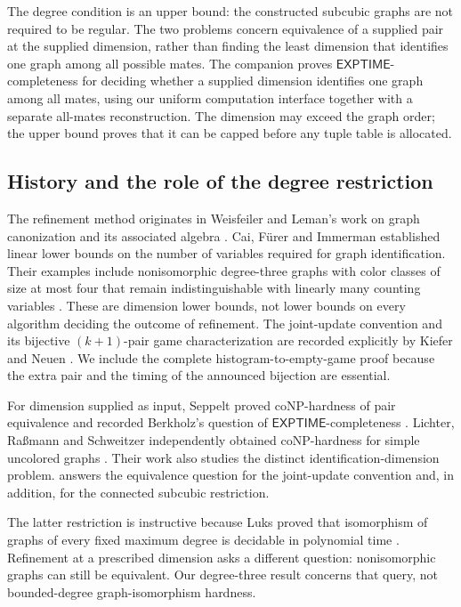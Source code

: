 \documentclass[11pt]{article}
\theoremstyle{definition}
\begin{document}
The degree condition is an upper bound: the constructed subcubic graphs
are not required to be regular. The two problems concern equivalence
of a supplied pair at the supplied dimension, rather than finding the
least dimension that identifies one graph among all possible mates.
The companion \citep[Theorem~1.1]{CompanionIdentification}
proves \(\mathsf{EXPTIME}\)-completeness for deciding whether a supplied
dimension identifies one graph among all mates, using our uniform
computation interface together with a separate all-mates reconstruction.
The dimension may exceed the graph order; the upper bound proves that
it can be capped before any tuple table is allocated.

\subsection{History and the role of the degree restriction}

The refinement method originates in Weisfeiler and Leman's work on
graph canonization and its associated algebra \citep{WeisfeilerLeman1968}.
Cai, F{\"u}rer and Immerman established linear lower bounds on the
number of variables required for graph identification. Their examples
include nonisomorphic degree-three graphs with color classes of size at most
four that remain indistinguishable with linearly many counting variables
\citep[Theorem~5.2 and Corollary~6.5]{CaiFurerImmerman1992}.
These are dimension lower bounds, not lower bounds on every algorithm
deciding the outcome of refinement. The joint-update convention and its
bijective \((k+1)\)-pair game characterization are recorded explicitly by
Kiefer and Neuen \citep[Section~2.2 and Theorem~1]{KieferNeuen2019}.
We include the complete histogram-to-empty-game proof because the
extra pair and the timing of the announced bijection are essential.

For dimension supplied as input, Seppelt proved coNP-hardness of
pair equivalence and recorded Berkholz's question of
\(\mathsf{EXPTIME}\)-completeness
\citep[Theorem~5 and the preceding question, p.~82:3]{Seppelt2024}.
Lichter, Ra{\ss}mann and Schweitzer independently obtained coNP-hardness
for simple uncolored graphs
\citep[Theorem~19]{LichterRassmannSchweitzer2025}.
Their work also studies the distinct identification-dimension problem.
 answers the equivalence question for the joint-update
convention and, in addition, for the connected subcubic restriction.

The latter restriction is instructive because Luks proved that
isomorphism of graphs of every fixed maximum degree is decidable in
polynomial time \citep{Luks1982}. Refinement at a prescribed dimension
asks a different question: nonisomorphic graphs can still be equivalent.
Our degree-three result concerns that query, not bounded-degree
graph-isomorphism hardness.
\end{document}
